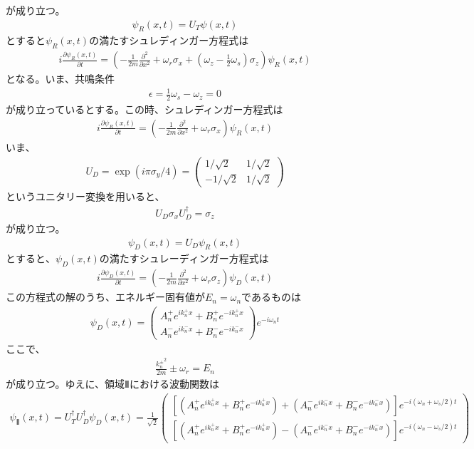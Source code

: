 が成り立つ。
\begin{align}
{\psi}_{R}(x,t)=U_{T}{\psi}(x,t)
\end{align}
$とすると{\psi}_{R}(x,t)の満たすシュレディンガー方程式は$
\begin{align}
i\frac{\partial {\psi}_{R}(x,t)}{\partial t}=\left(-\frac{1}{2m}\frac{\partial^2}{\partial x^2}+\omega_{r}{\sigma}_{x}+\left(\omega_{z}-\frac{1}{2}\omega_{s}\right){\sigma}_{z}\right){\psi}_{R}(x,t)
\end{align}
となる。いま、共鳴条件
\begin{align}
{\epsilon}=\frac{1}{2}\omega_{s}-\omega_{z}=0
\end{align}
が成り立っているとする。この時、シュレディンガー方程式は
\begin{align}
i\frac{\partial {\psi}_{R}(x,t)}{\partial t}=\left(-\frac{1}{2m}\frac{\partial^2}{\partial x^2}+\omega_{r}{\sigma}_{x}\right){\psi}_{R}(x,t)
\end{align}
いま、
\begin{align}
U_{D}=\exp(i{\pi}{\sigma}_{y}/4)=
\begin{pmatrix}
1/\sqrt{2} &1/\sqrt{2} \\
-1/\sqrt{2} &1/\sqrt{2}
\end{pmatrix}
\end{align}
というユニタリー変換を用いると、
\begin{align}
U_{D}{\sigma}_{x}U_{D}^{\dagger}={\sigma}_{z}
\end{align}
が成り立つ。
\begin{align}
{\psi}_{D}(x,t)=U_{D}{\psi}_{R}(x,t)
\end{align}
$とすると、{\psi}_{D}(x,t)の満たすシュレーディンガー方程式は$
\begin{align}
i\frac{\partial {\psi}_{D}(x,t)}{\partial t}=\left(-\frac{1}{2m}\frac{\partial^2}{\partial x^2}+\omega_{r}{\sigma}_{z}\right){\psi}_{D}(x,t)
\end{align}
$この方程式の解のうち、エネルギー固有値がE_{n}=\omega_{n}であるものは$
\begin{align}
{\psi}_{D}(x,t) =
\begin{pmatrix}
A_{n}^{+}e^{ik_{n}^{+}x}+B_{n}^{+}e^{-ik_{n}^{+}x}  \\
A_{n}^{-}e^{ik_{n}^{-}x}+B_{n}^{-}e^{-ik_{n}^{-}x}
\end{pmatrix}
e^{-i\omega_{n}t}
\end{align}
ここで、
\begin{align}
\frac{{k_{n}^{\pm}}^2}{2m}{\pm}\omega_{r}=E_{n}
\end{align}
が成り立つ。ゆえに、領域Ⅱにおける波動関数は
\begin{align}
{\psi}_{Ⅱ}(x,t)=U_{T}^{\dagger}U_{D}^{\dagger}{\psi}_{D}(x,t)=\frac{1}{\sqrt{2}}
\begin{pmatrix}
\left[(A_{n}^{+}e^{ik_{n}^{+}x}+B_{n}^{+}e^{-ik_{n}^{+}x})+(A_{n}^{-}e^{ik_{n}^{-}x}+B_{n}^{-}e^{-ik_{n}^{-}x})\right]e^{-i(\omega_{n}+\omega_{s}/2)t} \\
\left[(A_{n}^{+}e^{ik_{n}^{+}x}+B_{n}^{+}e^{-ik_{n}^{+}x})-(A_{n}^{-}e^{ik_{n}^{-}x}+B_{n}^{-}e^{-ik_{n}^{-}x})\right]e^{-i(\omega_{n}-\omega_{s}/2)t}
\end{pmatrix}
\end{align}

